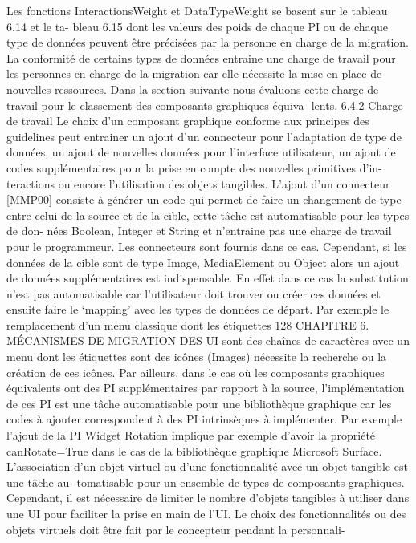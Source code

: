 \documentclass{article}
\begin{document}
Les fonctions InteractionsWeight et DataTypeWeight se basent sur le tableau 6.14 et le ta-
bleau 6.15 dont les valeurs des poids de chaque PI ou de chaque type de données peuvent être précisées
par la personne en charge de la migration.
La conformité de certains types de données entraine une charge de travail pour les personnes en
charge de la migration car elle nécessite la mise en place de nouvelles ressources. Dans la section
suivante nous évaluons cette charge de travail pour le classement des composants graphiques équiva-
lents.
6.4.2
Charge de travail
Le choix d’un composant graphique conforme aux principes des guidelines peut entrainer un ajout
d’un connecteur pour l’adaptation de type de données, un ajout de nouvelles données pour l’interface
utilisateur, un ajout de codes supplémentaires pour la prise en compte des nouvelles primitives d’in-
teractions ou encore l’utilisation des objets tangibles.
L’ajout d’un connecteur [MMP00] consiste à générer un code qui permet de faire un changement
de type entre celui de la source et de la cible, cette tâche est automatisable pour les types de don-
nées Boolean, Integer et String et n’entraine pas une charge de travail pour le programmeur. Les
connecteurs sont fournis dans ce cas.
Cependant, si les données de la cible sont de type Image, MediaElement ou Object alors un
ajout de données supplémentaires est indispensable. En effet dans ce cas la substitution n’est pas
automatisable car l’utilisateur doit trouver ou créer ces données et ensuite faire le ‘mapping’ avec les
types de données de départ. Par exemple le remplacement d’un menu classique dont les étiquettes
128
CHAPITRE 6. MÉCANISMES DE MIGRATION DES UI
sont des chaînes de caractères avec un menu dont les étiquettes sont des icônes (Images) nécessite la
recherche ou la création de ces icônes.
Par ailleurs, dans le cas où les composants graphiques équivalents ont des PI supplémentaires par
rapport à la source, l’implémentation de ces PI est une tâche automatisable pour une bibliothèque
graphique car les codes à ajouter correspondent à des PI intrinsèques à implémenter. Par exemple
l’ajout de la PI Widget Rotation implique par exemple d’avoir la propriété canRotate=True dans le
cas de la bibliothèque graphique Microsoft Surface.
L’association d’un objet virtuel ou d’une fonctionnalité avec un objet tangible est une tâche au-
tomatisable pour un ensemble de types de composants graphiques. Cependant, il est nécessaire de
limiter le nombre d’objets tangibles à utiliser dans une UI pour faciliter la prise en main de l’UI. Le
choix des fonctionnalités ou des objets virtuels doit être fait par le concepteur pendant la personnali-
\end{document}
